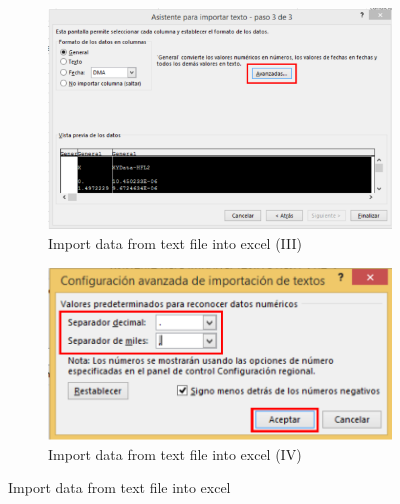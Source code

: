 \begin{itemize}
\begin{figure}[!h]
    \begin{subfigure}[!h]{0.50\textwidth}
      \includegraphics[width=\textwidth]{./body/images/post24.pdf}
      \caption{Import data from text file into excel (III)}
      \label{post24}
    \end{subfigure}%
    \begin{subfigure}[!h]{0.50\textwidth}
      \includegraphics[width=\textwidth]{./body/images/post25.pdf}
      \caption{Import data from text file into excel (IV)}
      \label{post25}
    \end{subfigure}%
    \caption{Import data from text file into excel}
  \end{figure}


\end{itemize}
